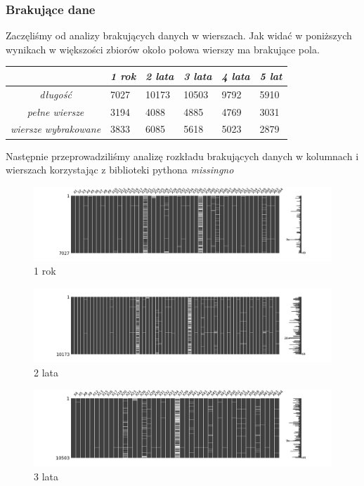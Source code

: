 \documentclass[11pt]{article}
\begin{document}
\subsubsection{Brakujące dane}
Zaczęliśmy od analizy brakujących danych w wierszach. Jak widać w poniższych wynikach w większości zbiorów około połowa wierszy ma brakujące pola.
\begin{center}
\begin{tabular}{|c|m{0.7in}|m{0.7in}|m{0.7in}|m{0.7in}|m{0.7in}|}
	\hline
	& \textit{1 rok} & \textit{2 lata} & \textit{3 lata} & \textit{4 lata} & \textit{5 lat} \\ \hline
	\textit{długość} & 7027 & 10173 & 10503 & 9792 & 5910 \\ \hline
	\textit{pełne wiersze} & 3194 & 4088 & 4885 & 4769 & 3031 \\ \hline
	\textit{wiersze wybrakowane} & 3833 & 6085 & 5618 & 5023 & 2879 \\ \hline
\end{tabular}
\end{center}
Następnie przeprowadziliśmy analizę rozkładu brakujących danych w kolumnach i wierszach korzystając z biblioteki pythona \textit{missingno}\\

\begin{figure}[h]
\caption{1 rok}
	\includegraphics[width=\textwidth]{year_1}
\end{figure}

\begin{figure}[h]
\caption{2 lata}
	\includegraphics[width=\textwidth]{year_2}
\end{figure}

\begin{figure}[h]
\caption{3 lata}
	\includegraphics[width=\textwidth]{year_3}
\end{figure}
\end{document}
